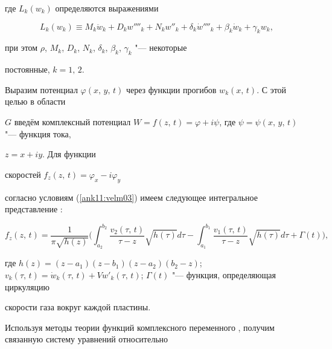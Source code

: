где $L_k(w_k)$ определяются выражениями

$$

L_k (w_k) \equiv M_k \ddot w_k + D_k

w''''_k + N_k w''_k + \delta_k \dot {w}''''_k + \beta

_k \dot {w}_k + \gamma_k w_k,

$$

при этом  $\rho$, $M_k$, $D_k$, $N_k$, $\delta_k$, $\beta_k$, $\gamma_k$ "--- некоторые

постоянные, $k = 1,\,2$.



\smallskip




Выразим потенциал \linebreak  $\varphi(x,\,y,\,t)$ через функции прогибов $w_k (x,\,t)$. С этой целью в области

$G$ введём комплексный потенциал $W = f (z,\,t) = \varphi +

i \psi $, где $\psi = \psi (x,\,y,\,t)$ "--- функция тока,

$z=x+iy$. Для функции

скоростей $f_z (z,\,t) = \varphi_x - i \varphi_y$

согласно условиям (\ref{ank11:velm03}) имеем следующее интегральное представление \cite{velmBibl1}:

\begin{equation}

\label{ank11:velm05}

f_z (z,\,t) = \frac{1}{\pi \sqrt {h (z)}} \biggl( \int _{a_2}

^{b_2}  \frac{v_2 (\tau,\,t)}{\tau - z} \sqrt {h (\tau)} d\tau  - \int_{a_1}

^{b_1}  \frac{v_1 (\tau,\,t)}{\tau - z} \sqrt {h (\tau )} d\tau  + \Gamma (t ) \biggr),

\end{equation}

где $h (z) = (z - a_1) (z - b_1) (z - a_2) (b_2 - z)$; $v_k (\tau,\,t) = \dot {w}_k (\tau,\,t) + V w'_k

(\tau,\,t)$; $\Gamma (t)$ "--- функция, определяющая циркуляцию

скорости газа вокруг каждой \mbox{пластины.}



Используя методы теории функций комплексного переменного \cite{velmBibl2}, получим связанную систему уравнений относительно

